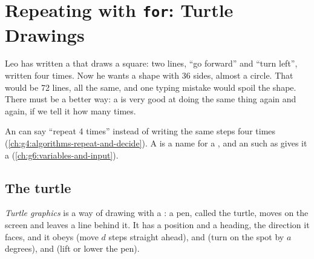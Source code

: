 \chapter{Repeating with \texttt{for}: Turtle Drawings}\label{ch:g6:for-loops-turtle}

Leo has written a  that draws a square: two lines, ``go forward'' and
``turn left'', written four times. Now he wants a shape with 36 sides, almost a
circle. That would be 72 lines, all the same, and one typing mistake would spoil
the shape. There must be a better way: a  is very good at doing the same
thing again and again, if we tell it how many times.

\begin{recall}
An  can say ``repeat 4 times'' instead of writing the same steps four
times (\cref{ch:g4:algorithms-repeat-and-decide}). A  is a name for a
, and an  such as  gives it a 
(\cref{ch:g6:variables-and-input}).
\end{recall}

\section{The turtle}

\begin{definition}\label{def:g6:for-loops-turtle:turtle}
\emph{Turtle graphics} is a way of drawing with a
: a pen, called the turtle, moves on the screen and leaves a line behind
it. It has a position and a heading, the direction it faces, and it obeys
 (move $d$ steps straight ahead),  and
 (turn on the spot by $a$ degrees),  and
 (lift or lower the pen).
\end{definition}

